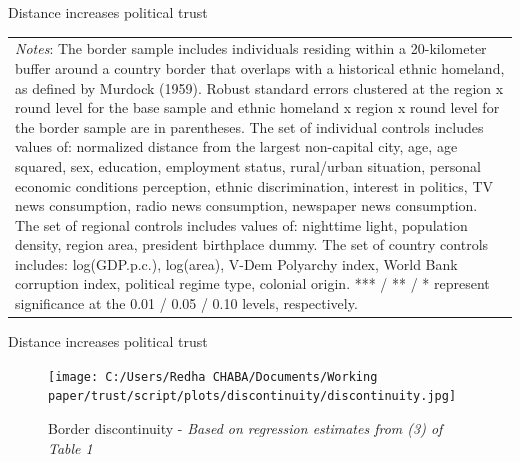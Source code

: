 \documentclass[10pt]{beamer}
\begin{document}
\begin{frame}{Distance increases political trust}
\begin{table}[H]
{\begin{tabular}{@{\extracolsep{5pt}} l c c c c}
                              \bottomrule
        \multicolumn{5}{p{12.5cm}}{\footnotesize \emph{Notes}: The border sample includes individuals residing within a 20-kilometer buffer around a country border that overlaps with a historical ethnic homeland, as defined by Murdock (1959). Robust standard errors clustered at the region x round level  for the base sample and ethnic homeland x region x round level for the border sample are in parentheses. The set of individual controls
        includes values of: normalized distance from the largest non-capital city, age, age squared, sex,
        education, employment status, rural/urban situation, personal economic conditions perception, ethnic discrimination, interest in politics, TV news consumption, radio news consumption, newspaper news consumption. The set of regional controls includes values of: nighttime light, population density, region area, president birthplace dummy. The set of country controls includes: log(GDP.p.c.), log(area), V-Dem Polyarchy index, World Bank corruption index, political regime type, colonial origin. *** / ** / * represent significance at the 0.01 / 0.05 / 0.10 levels, respectively.}
        \end{tabular}
        }
        \end{table}
    \end{frame}

\begin{frame}{Distance increases political trust}

\begin{figure}
    \texttt{[image: C:/Users/Redha CHABA/Documents/Working paper/trust/script/plots/discontinuity/discontinuity.jpg]}
    \caption{Border discontinuity - \textit{Based on regression estimates from (3) of Table 1}}
\end{figure}

\end{frame}
\end{document}
